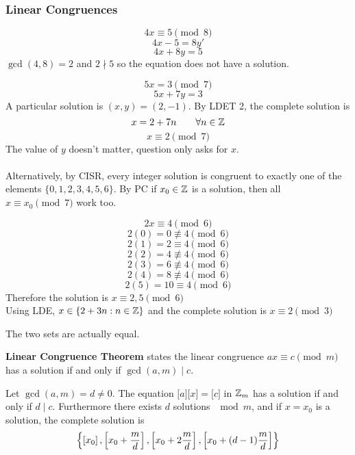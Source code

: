 \documentclass[english, 12pt]{article}
\begin{document}
\subsubsection*{Linear Congruences}
\begin{exmp}
\[4x \equiv 5 \pmod 8 \]
\[4x -5 = 8y' \]
\[4x+8y=5 \]
$\gcd(4,8) = 2$ and $2 \nmid 5$ so the equation does not have a solution.
\end{exmp}
\begin{exmp}
\[5x = 3 \pmod 7 \]
\[5x + 7y = 3 \]
A particular solution is $(x,y)=(2,-1)$. By LDET 2, the complete solution is 
\[x = 2 + 7n \qquad\forall n \in {\mathbb{Z}} \]
\[ x \equiv 2 \pmod 7 \]
The value of $y$ doesn't matter, question only asks for $x$.\\\\
Alternatively, by CISR, every integer solution is congruent to exactly one of the elements $\{0,1,2,3,4,5,6\}$. By PC if $x_{0}\in {\mathbb{Z}}$ is a solution, then all $x\equiv x_{0} \pmod 7$ work too.
\end{exmp}
\begin{exmp}
\[2x \equiv 4 \pmod 6 \]
\[2(0) = 0 \not\equiv 4 \pmod 6 \]
\[2(1) = 2 \equiv 4 \pmod 6 \]
\[2(2) = 4 \not\equiv 4 \pmod 6 \]
\[2(3) = 6 \not\equiv 4 \pmod 6 \]
\[2(4) = 8 \not\equiv 4 \pmod 6 \]
\[2(5) = 10 \equiv 4 \pmod 6 \]
Therefore the solution is $x\equiv 2, 5 \pmod 6$\\
Using LDE, $x \in \{2 + 3n : n \in {\mathbb{Z}}\}$ and the complete solution is $x \equiv 2 \pmod 3$
\begin{note}
The two sets are actually equal.
\end{note}
\end{exmp}
\begin{defn}[LCT 1]
\textbf{Linear Congruence Theorem} states the linear congruence $ax \equiv c \pmod m$ has a solution if and only if $\gcd(a,m) \mid c$.
\end{defn}
\begin{defn}[LCT 2]
Let $\gcd(a,m) = d \neq 0$. The equation $\lbrack a \rbrack \lbrack x \rbrack = \lbrack c \rbrack$ in ${\mathbb{Z}}_{m}$ has a solution if and only if $d \mid c$.
Furthermore there exists $d$ solutions $\mod m$, and if $x =x_{0}$ is a solution, the complete solution is 
\[ \left\{ \left\lbrack x_{0} \right\rbrack,\left\lbrack x_{0} + \frac{m}{d} \right\rbrack,\left\lbrack x_{0} + 2 \frac{m}{d} \right\rbrack,\left\lbrack x_{0} + (d-1)\frac{m}{d} \right\rbrack\right\} \]
\end{defn}
\end{document}
